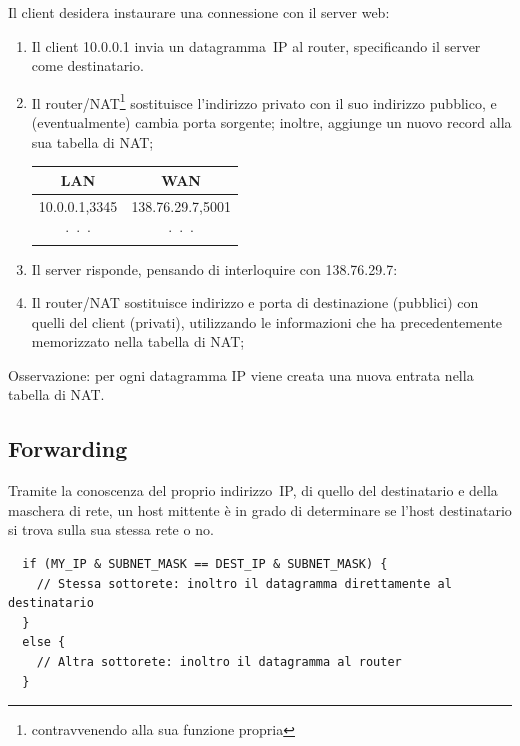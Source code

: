 \documentclass[12pt,a4paper]{article}
\begin{document}
Il client desidera instaurare una connessione con il server web:
\begin{enumerate}
  \item Il client 10.0.0.1 invia un datagramma~IP al router, specificando
    il server come destinatario.\\
  \item Il router/NAT\footnote{contravvenendo alla sua funzione propria}
    sostituisce l'indirizzo privato con il suo indirizzo pubblico, e
    (eventualmente) cambia porta sorgente; inoltre, aggiunge un nuovo
    record alla sua tabella di NAT;
    \begin{table}[H]
      \centering
      \begin{tabular}{c | c}
      LAN                 & WAN \\ \hline
      10.0.0.1,3345       & 138.76.29.7,5001  \\
      ···                 & ···
    \end{tabular}
    \end{table}
  \item Il server risponde, pensando di interloquire con 138.76.29.7:\\
  \item Il router/NAT sostituisce indirizzo e porta di destinazione (pubblici)
    con quelli del client (privati), utilizzando le informazioni che ha
    precedentemente memorizzato nella tabella di NAT;\\
\end{enumerate}

Osservazione: per ogni datagramma IP viene creata una nuova entrata nella
tabella di NAT.

\subsection{Forwarding}
Tramite la conoscenza del proprio indirizzo~IP, di quello del destinatario
e della maschera di rete, un host mittente è in grado di determinare se
l'host destinatario si trova sulla sua stessa rete o no.

\begin{verbatim}
  if (MY_IP & SUBNET_MASK == DEST_IP & SUBNET_MASK) {
    // Stessa sottorete: inoltro il datagramma direttamente al destinatario
  }
  else {
    // Altra sottorete: inoltro il datagramma al router
  }
\end{verbatim}
\end{document}
